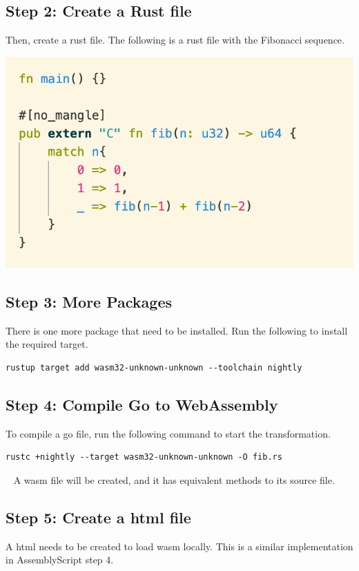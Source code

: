 \documentclass[12pt]{article}
\begin{document}
\subsection{Step 2: Create a Rust file}
Then, create a rust file. The following is a rust file with the Fibonacci sequence.
~\newline

\includegraphics[scale = 0.6]{img/rust-fib}

\subsection{Step 3: More Packages}
There is one more package that need to be installed. Run the following to install the required target.
~\newline
\begin{verbatim}
rustup target add wasm32-unknown-unknown --toolchain nightly
\end{verbatim}

\subsection{Step 4: Compile Go to WebAssembly}
To compile a go file, run the following command to start the transformation.
~\newline
\begin{verbatim}
rustc +nightly --target wasm32-unknown-unknown -O fib.rs
\end{verbatim}
~\newline
A wasm file will be created, and it has equivalent methods to its source file.

\subsection{Step 5: Create a html file}
A html needs to be created to load wasm locally. This is a similar implementation in AssemblyScript step 4.
\end{document}
